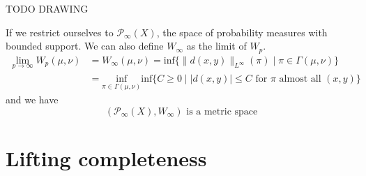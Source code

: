 \documentclass[15pt]{article}
\begin{document}
\bigbreak
TODO DRAWING


If we restrict ourselves to $\mathcal{P}_\infty(X)$, the space of probability measures with bounded support. We can also define $W_\infty$ as the limit of $W_p$.
\begin{align*}\lim_{p \to \infty} W_p(\mu,\nu) &= W_\infty(\mu,\nu) =\text{inf}\{\|d(x,y)\|_{L^\infty}(\pi) \mid \pi \in \Gamma(\mu,\nu)\} \\
&= \underset{\pi \in \Gamma(\mu,\nu)}{\text{inf}}\text{inf}\{C \geq 0 \mid |d(x,y)| \leq C \text{ for } \pi \text{ almost all } (x,y)\} \end{align*} 
and we have $$(\mathcal{P}_\infty(X), W_\infty) \text{ is a metric space}$$
\newpage
\section*{Lifting completeness}
\end{document}
